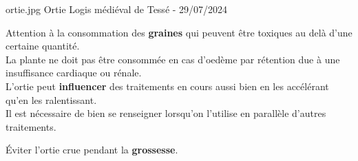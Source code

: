 {\begin{multicols}{2}
\end{multicols}

}
{%
    ortie.jpg
}
{%
    Ortie
}
{%
    Logis médiéval de Tessé - 29/07/2024 
}
\begin{Remarque}

    \bcattention Attention à la consommation des \textbf{graines} qui peuvent être toxiques au delà d'une certaine quantité.\\

    \bcattention La plante ne doit pas être consommée en cas d'oedème par rétention due à une insuffisance cardiaque ou rénale.\\

    \bcattention L'ortie peut \textbf{influencer} des traitements en cours aussi bien en les accélérant qu'en les ralentissant.\\
    Il est nécessaire de bien se renseigner lorsqu'on l'utilise en parallèle d'autres traitements.

    \bcattention \'Eviter l'ortie crue pendant la \textbf{grossesse}.
\end{Remarque}
\renewcommand{\cita}{}

